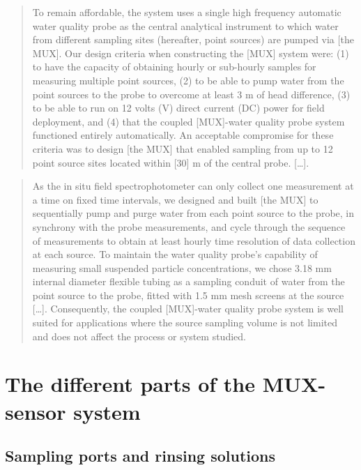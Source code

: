\documentclass[]{book}
\begin{document}
\begin{quote}
To remain affordable, the system uses a single high frequency automatic water quality probe as the central analytical
instrument to which water from different sampling sites (hereafter, point sources) are pumped via {[}the MUX{]}. Our design criteria when constructing the {[}MUX{]} system were: (1) to have the capacity of obtaining hourly or sub-hourly samples for measuring multiple point sources, (2) to be able to pump water from the point sources to the probe to overcome at least 3 m of head difference, (3) to be able to run on 12 volts (V) direct current (DC) power for field deployment, and (4) that the coupled {[}MUX{]}-water quality probe system functioned entirely automatically. An acceptable compromise for these criteria was to design {[}the MUX{]} that enabled sampling from up to 12 point source sites located within {[}30{]} m of the central probe. {[}\ldots{}{]}.
\end{quote}

\begin{quote}
As the in situ field spectrophotometer can only collect one measurement at a time on fixed time intervals, we designed and built {[}the MUX{]} to sequentially pump and purge water from each point source to the probe, in synchrony with the probe measurements, and cycle through the sequence of measurements to obtain at least hourly time resolution of data collection at each source. To maintain the water quality probe's capability of measuring small suspended particle concentrations, we chose 3.18 mm internal diameter flexible tubing as a sampling conduit of water from the point source to the probe, fitted with 1.5 mm mesh screens at the source {[}\ldots{}{]}. Consequently, the coupled {[}MUX{]}-water quality probe system is well suited for applications where the source sampling volume is not limited and does not affect the process or system studied.
\end{quote}

\hypertarget{the-different-parts-of-the-mux-sensor-system}{%
\section{The different parts of the MUX-sensor system}\label{the-different-parts-of-the-mux-sensor-system}}

\hypertarget{sampling-ports-and-rinsing-solutions}{%
\subsection{Sampling ports and rinsing solutions}\label{sampling-ports-and-rinsing-solutions}}
\end{document}
